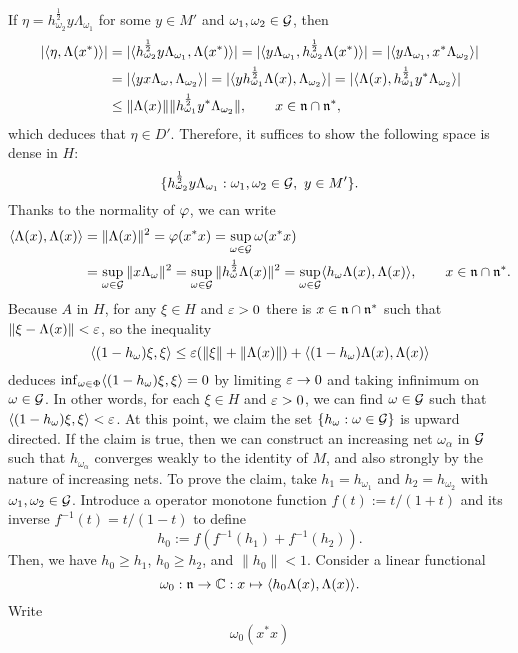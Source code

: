 \documentclass{../../small}
\begin{document}
\begin{pf}
If $\eta=h_{\omega_2}^{\frac12}y\Lambda_{\omega_1}$ for some $y\in M'$ and $\omega_1,\omega_2\in\mathcal{G}$, then
\begin{align*}
|\langle\eta,\Lambda(x^*)\rangle|
&=|\langle h_{\omega_2}^{\frac12}y\Lambda_{\omega_1},\Lambda(x^*)\rangle|=|\langle y\Lambda_{\omega_1},h_{\omega_2}^{\frac12}\Lambda(x^*)\rangle|=|\langle y\Lambda_{\omega_1},x^*\Lambda_{\omega_2}\rangle|\\
&=|\langle yx\Lambda_\omega,\Lambda_{\omega_2}\rangle|=|\langle yh_{\omega_1}^{\frac12}\Lambda(x),\Lambda_{\omega_2}\rangle|=|\langle\Lambda(x),h_{\omega_1}^{\frac12}y^*\Lambda_{\omega_2}\rangle|\\
&\le\|\Lambda(x)\|\|h_{\omega_1}^{\frac12}y^*\Lambda_{\omega_2}\|,\qquad x\in\mathfrak{n}\cap\mathfrak{n}^*,
\end{align*}
which deduces that $\eta\in D'$.
Therefore, it suffices to show the following space is dense in $H$:
\[\{h_{\omega_2}^{\frac12}y\Lambda_{\omega_1}:\omega_1,\omega_2\in\cG,\ y\in M'\}.\]
Thanks to the normality of $\varphi$, we can write
\begin{align*}
\langle\Lambda(x),\Lambda(x)\rangle&=\|\Lambda(x)\|^2=\varphi(x^*x)=\sup_{\omega\in\mathcal{G}}\omega(x^*x)\\
&=\sup_{\omega\in\mathcal{G}}\|x\Lambda_\omega\|^2=\sup_{\omega\in\mathcal{G}}\|h_\omega^{\frac12}\Lambda(x)\|^2=\sup_{\omega\in\mathcal{G}}\langle h_\omega\Lambda(x),\Lambda(x)\rangle,\qquad x\in\mathfrak{n}\cap\mathfrak{n}^*.
\end{align*}
Because $A$ in $H$, for any $\xi\in H$ and $\varepsilon>0$ there is $x\in\mathfrak{n}\cap\mathfrak{n}^*$ such that $\|\xi-\Lambda(x)\|<\varepsilon$, so the inequality
\[\langle(1-h_\omega)\xi,\xi\rangle\le\varepsilon(\|\xi\|+\|\Lambda(x)\|)+\langle(1-h_\omega)\Lambda(x),\Lambda(x)\rangle\]
deduces $\inf_{\omega\in\Phi}\langle(1-h_\omega)\xi,\xi\rangle=0$ by limiting $\varepsilon\to0$ and taking infinimum on $\omega\in\mathcal{G}$.
In other words, for each $\xi\in H$ and $\varepsilon>0$, we can find $\omega\in\mathcal{G}$ such that $\langle(1-h_\omega)\xi,\xi\rangle<\varepsilon$.
At this point, we claim the set $\{h_\omega:\omega\in\mathcal{G}\}$ is upward directed.
If the claim is true, then we can construct an increasing net $\omega_\alpha$ in $\mathcal{G}$ such that $h_{\omega_\alpha}$ converges weakly to the identity of $M$, and also strongly by the nature of increasing nets.
To prove the claim, take $h_1=h_{\omega_1}$ and $h_2=h_{\omega_2}$ with $\omega_1,\omega_2\in\mathcal{G}$.
Introduce a operator monotone function $f(t):=t/(1+t)$ and its inverse $f^{-1}(t)=t/(1-t)$ to define 
\[h_0:=f(f^{-1}(h_1)+f^{-1}(h_2)).\]
Then, we have $h_0\ge h_1$, $h_0\ge h_2$, and $\|h_0\|<1$.
Consider a linear functional
\[\omega_0:\mathfrak{n}\to\mathbb{C}:x\mapsto\langle h_0\Lambda(x),\Lambda(x)\rangle.\]
Write
\begin{align*}
\omega_0(x^*x)

\end{align*}
\end{pf}
\end{document}
